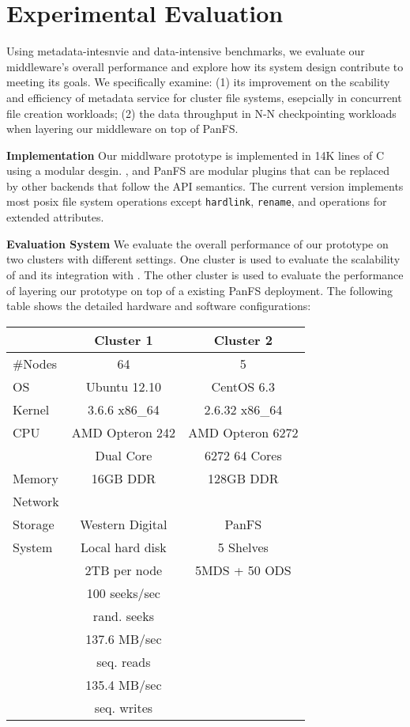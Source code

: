 \section{Experimental Evaluation}

Using metadata-intesnvie and data-intensive benchmarks,
we evaluate our middleware's overall performance
and explore how its system design contribute to meeting its goals.
We specifically examine: (1) its improvement on the scability and
efficiency of metadata service for cluster file systems,
esepcially in concurrent file creation workloads;
(2) the data throughput in N-N checkpointing workloads
when layering our middleware on top of PanFS.

\textbf{Implementation }
Our middlware prototype is implemented in 14K lines of C using a modular desgin.
\tfs, \ldb and PanFS are modular plugins that can be replaced by other backends
that follow the API semantics. The current version implements most posix
file system operations except \texttt{hardlink}, \texttt{rename},
and operations for extended attributes.

\textbf{Evaluation System }
We evaluate the overall performance of our prototype
on two clusters with different settings.
One cluster is used to evaluate the scalability of \tfs and its integration with \giga.
The other cluster is used to evaluate the performance of layering our
prototype on top of a existing PanFS deployment.
The following table shows the detailed hardware and software configurations:

\begin{center}
\begin{tabular}{lcc}
\toprule
      & Cluster 1 & Cluster 2 \\
\midrule
\#Nodes & 64  &  5 \\
\hline
OS & Ubuntu 12.10  &   CentOS 6.3  \\
Kernel & 3.6.6 x86\_64 & 2.6.32 x86\_64\\
\hline
CPU & AMD Opteron 242   &  AMD Opteron 6272 \\
    & Dual Core & 6272 64 Cores\\
\hline
Memory & 16GB DDR &  128GB DDR \\
\hline
Network &       &           \\
\hline
Storage & Western Digital &  PanFS\\
System & Local hard disk &      5 Shelves \\
       &  2TB per node &   5MDS + 50 ODS \\
& 100 seeks/sec & \\
& rand. seeks        & \\
& 137.6 MB/sec & \\
& seq. reads      & \\
& 135.4 MB/sec & \\
& seq. writes      & \\
\bottomrule
\end{tabular}
\end{center}


